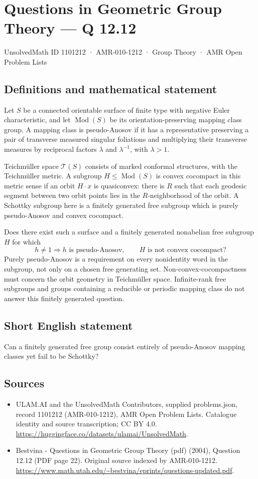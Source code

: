 \documentclass[11pt,a4paper]{article}
\begin{document}
\section*{Questions in Geometric Group Theory — Q 12.12}\label{1101212}
{\small UnsolvedMath ID 1101212 · AMR-010-1212 · Group Theory · AMR Open Problem Lists}
\subsection{Definitions and mathematical statement}
Let $S$ be a connected orientable surface of finite type with negative Euler characteristic, and let $\operatorname{Mod}(S)$ be its orientation-preserving mapping class group. A mapping class is pseudo-Anosov if it has a representative preserving a pair of transverse measured singular foliations and multiplying their transverse measures by reciprocal factors $\lambda$ and $\lambda^{-1}$, with $\lambda>1$.

Teichm\"uller space $\mathcal T(S)$ consists of marked conformal structures, with the Teichm\"uller metric. A subgroup $H\leq\operatorname{Mod}(S)$ is convex cocompact in this metric sense if an orbit $H\cdot x$ is quasiconvex: there is $R$ such that each geodesic segment between two orbit points lies in the $R$-neighborhood of the orbit. A Schottky subgroup here is a finitely generated free subgroup which is purely pseudo-Anosov and convex cocompact.

Does there exist such a surface and a finitely generated nonabelian free subgroup $H$ for which
\[
 h\ne1\Longrightarrow h\text{ is pseudo-Anosov},
 \qquad H\text{ is not convex cocompact}?
\]
Purely pseudo-Anosov is a requirement on every nonidentity word in the subgroup, not only on a chosen free generating set. Non-convex-cocompactness must concern the orbit geometry in Teichm\"uller space. Infinite-rank free subgroups and groups containing a reducible or periodic mapping class do not answer this finitely generated question.
\subsection{Short English statement}
Can a finitely generated free group consist entirely of pseudo-Anosov mapping classes yet fail to be Schottky?
\subsection{Sources}
\begin{itemize}
\item[S1] ULAM.AI and the UnsolvedMath Contributors, supplied problems.json, record 1101212 (AMR-010-1212), AMR Open Problem Lists. Catalogue identity and source transcription; CC BY 4.0.
\url{https://huggingface.co/datasets/ulamai/UnsolvedMath}.
\item[S2] Bestvina - Questions in Geometric Group Theory (pdf) (2004), Question 12.12 (PDF page 22). Original source indexed by AMR-010-1212.
\url{https://www.math.utah.edu/~bestvina/eprints/questions-updated.pdf}.
\end{itemize}
\end{document}
